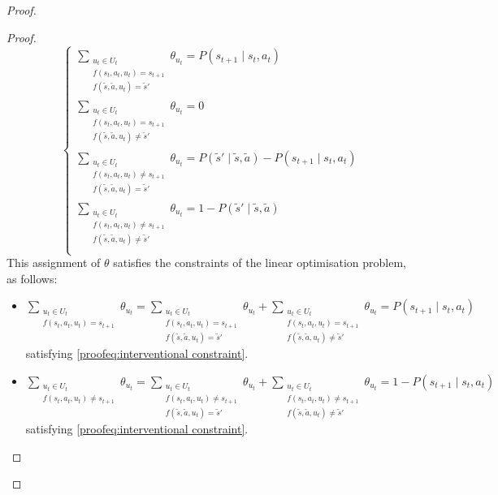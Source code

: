 \begin{proof}
\begin{proof}
\[
\begin{cases}
    \sum_{\substack{u_t \in U_t \\f(s_t, a_t, u_t) = s_{t+1} \\ f(\tilde{s}, \tilde{a}, u_t) = \tilde{s}'}} \theta_{u_t}= P(s_{t+1} \mid s_t, a_t)\\
    \sum_{\substack{u_t \in U_t \\f(s_t, a_t, u_t) = s_{t+1} \\ f(\tilde{s}, \tilde{a}, u_t) \neq \tilde{s}'}} \theta_{u_t} = 0\\
    \sum_{\substack{u_t \in U_t \\f(s_t, a_t, u_t) \neq s_{t+1} \\ f(\tilde{s}, \tilde{a}, u_t) = \tilde{s}'}} \theta_{u_t} = P(\tilde{s}' \mid \tilde{s}, \tilde{a}) - P(s_{t+1} \mid s_t, a_t)\\
    \sum_{\substack{u_t \in U_t \\f(s_t, a_t, u_t) \neq s_{t+1} \\ f(\tilde{s}, \tilde{a}, u_t) \neq \tilde{s}'}} \theta_{u_t} = 1 - P(\tilde{s}' \mid \tilde{s}, \tilde{a})\\
\end{cases}
\]
    This assignment of $\theta$ satisfies the constraints of the linear optimisation problem, as follows:

    \begin{itemize}        
        \item $\sum_{\substack{u_t \in U_t \\f(s_t, a_t, u_t) = s_{t+1}}} \theta_{u_t} = \sum_{\substack{u_t \in U_t \\f(s_t, a_t, u_t) = s_{t+1} \\ f(\tilde{s}, \tilde{a}, u_t) = \tilde{s}'}} \theta_{u_t} + \sum_{\substack{u_t \in U_t \\f(s_t, a_t, u_t) = s_{t+1} \\ f(\tilde{s}, \tilde{a}, u_t) \neq \tilde{s}'}} \theta_{u_t} = P(s_{t+1} \mid s_t, a_t)$ \\satisfying \eqref{proofeq:interventional constraint}.

        \item $\sum_{\substack{u_t \in U_t\\f(s_t, a_t, u_t) \neq s_{t+1}}}{\theta_{u_t}} = \sum_{\substack{u_t \in U_t \\f(s_t, a_t, u_t) \neq s_{t+1} \\ f(\tilde{s}, \tilde{a}, u_t) = \tilde{s}'}} \theta_{u_t} + \sum_{\substack{u_t \in U_t \\f(s_t, a_t, u_t) \neq s_{t+1} \\ f(\tilde{s}, \tilde{a}, u_t) \neq \tilde{s}'}} \theta_{u_t} =1 -
        P(s_{t+1} \mid s_t, a_t)$ satisfying \eqref{proofeq:interventional constraint}.
        

\end{itemize}
\end{proof}
\end{proof}
